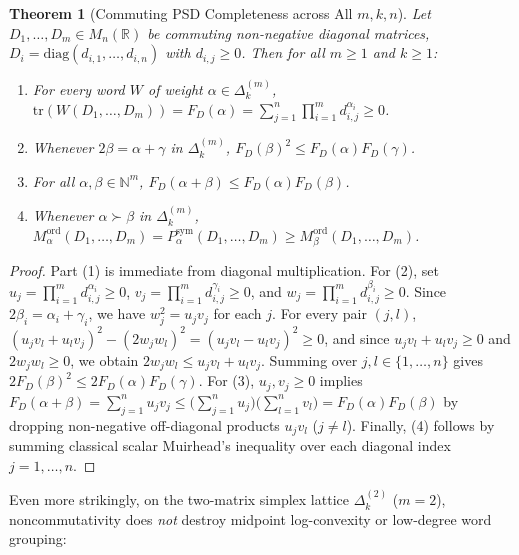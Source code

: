 \documentclass[11pt,a4paper]{article}
\newtheorem{theorem}{Theorem}[section]
\theoremstyle{definition}
\theoremstyle{remark}
\newcommand{\tr}{\mathrm{tr}}
\newcommand{\DeltaLat}{\Delta}
\newcommand{\Mord}{M^{\mathrm{ord}}}
\newcommand{\Psym}{P^{\mathrm{sym}}}
\begin{document}
\begin{theorem}[Commuting PSD Completeness across All $m, k, n$]\label{thm:commuting}
Let $D_1, \dots, D_m \in M_n(\mathbb{R})$ be commuting non-negative diagonal matrices, $D_i = \mathrm{diag}(d_{i,1},\dots,d_{i,n})$ with $d_{i,j} \ge 0$. Then for all $m \ge 1$ and $k \ge 1$:
\begin{enumerate}
\item For every word $W$ of weight $\alpha \in \DeltaLat_k^{(m)}$, $\tr(W(D_1,\dots,D_m)) = F_D(\alpha) = \sum_{j=1}^n \prod_{i=1}^m d_{i,j}^{\alpha_i} \ge 0$.
\item Whenever $2\beta = \alpha + \gamma$ in $\DeltaLat_k^{(m)}$, $F_D(\beta)^2 \le F_D(\alpha) F_D(\gamma)$.
\item For all $\alpha, \beta \in \mathbb{N}^m$, $F_D(\alpha + \beta) \le F_D(\alpha) F_D(\beta)$.
\item Whenever $\alpha \succ \beta$ in $\DeltaLat_k^{(m)}$, $\Mord_\alpha(D_1,\dots,D_m) = \Psym_\alpha(D_1,\dots,D_m) \ge \Mord_\beta(D_1,\dots,D_m)$.
\end{enumerate}
\end{theorem}
\begin{proof}
Part (1) is immediate from diagonal multiplication. For (2), set $u_j = \prod_{i=1}^m d_{i,j}^{\alpha_i} \ge 0$, $v_j = \prod_{i=1}^m d_{i,j}^{\gamma_i} \ge 0$, and $w_j = \prod_{i=1}^m d_{i,j}^{\beta_i} \ge 0$. Since $2\beta_i = \alpha_i + \gamma_i$, we have $w_j^2 = u_j v_j$ for each $j$. For every pair $(j,l)$, $(u_j v_l + u_l v_j)^2 - (2 w_j w_l)^2 = (u_j v_l - u_l v_j)^2 \ge 0$, and since $u_j v_l + u_l v_j \ge 0$ and $2 w_j w_l \ge 0$, we obtain $2 w_j w_l \le u_j v_l + u_l v_j$. Summing over $j, l \in \{1,\dots,n\}$ gives $2 F_D(\beta)^2 \le 2 F_D(\alpha) F_D(\gamma)$. For (3), $u_j, v_j \ge 0$ implies $F_D(\alpha+\beta) = \sum_{j=1}^n u_j v_j \le \bigl(\sum_{j=1}^n u_j\bigr)\bigl(\sum_{l=1}^n v_l\bigr) = F_D(\alpha) F_D(\beta)$ by dropping non-negative off-diagonal products $u_j v_l$ ($j \ne l$). Finally, (4) follows by summing classical scalar Muirhead's inequality \cite{Muirhead1903} over each diagonal index $j = 1,\dots,n$.
\end{proof}

Even more strikingly, on the two-matrix simplex lattice $\DeltaLat_k^{(2)}$ ($m = 2$), noncommutativity does \emph{not} destroy midpoint log-convexity or low-degree word grouping:
\end{document}
